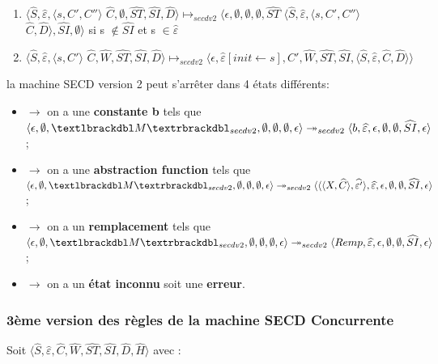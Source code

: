 \documentclass[10pt,a4paper]{article}
\begin{document}
\begin{enumerate}
					\item $\langle\widehat{S},\widehat{\varepsilon},\langle s, C',C''\rangle$ $\widehat{C},\emptyset,\widehat{ST},\widehat{SI},\widehat{D}\rangle \longmapsto_{secdv2} \langle\epsilon,\emptyset,\emptyset,\emptyset,\widehat{ST}$ $\langle\widehat{S},\widehat{\varepsilon},\langle s, C',C''\rangle$ $\widehat{C},\widehat{D}\rangle,\widehat{SI},\emptyset\rangle$ si s $\notin \widehat{SI}$ et s $\in \widehat{\varepsilon}$ 
					\item $\langle\widehat{S},\widehat{\varepsilon},\langle s, C'\rangle$ $\widehat{C},\widehat{W},\widehat{ST},\widehat{SI},\widehat{D}\rangle \longmapsto_{secdv2} \langle\epsilon,\widehat{\varepsilon}[init \leftarrow s],C',\widehat{W},\widehat{ST},\widehat{SI},\langle\widehat{S},\widehat{\varepsilon},\widehat{C},\widehat{D}\rangle\rangle$
				\end{enumerate}
				\bigbreak
				
				
				la machine SECD version 2 peut s'arrêter dans 4 états différents:
				\begin{itemize}
					\item[]$\longrightarrow$ on a une \textbf{constante b} tels que $\langle \epsilon,\emptyset,\textlbrackdbl M\textrbrackdbl_{secdv2},\emptyset,\emptyset,\emptyset,\epsilon\rangle \twoheadrightarrow_{secdv2} \langle b,\widehat{\varepsilon},\epsilon,\emptyset,\emptyset,\widehat{SI},\epsilon\rangle$;
					\item[]$\longrightarrow$ on a une \textbf{abstraction function} tels que $\langle \epsilon,\emptyset,\textlbrackdbl M\textrbrackdbl_{secdv2},\emptyset,\emptyset,\emptyset,\epsilon\rangle \twoheadrightarrow_{secdv2} \langle\langle\langle X,\widehat{C}\rangle,\widehat{\varepsilon'}\rangle,\widehat{\varepsilon},\epsilon,\emptyset,\emptyset,\widehat{SI},\epsilon\rangle$;
					\item[]$\longrightarrow$ on a un \textbf{remplacement} tels que $\langle \epsilon,\emptyset,\textlbrackdbl M\textrbrackdbl_{secdv2},\emptyset,\emptyset,\emptyset,\epsilon\rangle \twoheadrightarrow_{secdv2} \langle Remp,\widehat{\varepsilon},\epsilon,\emptyset,\emptyset,\widehat{SI},\epsilon\rangle$;
					\item[]$\longrightarrow$ on a un \textbf{état inconnu} soit une \textbf{erreur}.
				\end{itemize}
				\newpage
				
				\subsubsection{3ème version des règles de la machine SECD Concurrente}\label{SECDConc3}
					Soit $\langle\widehat{S},\widehat{\varepsilon},\widehat{C},\widehat{W},\widehat{ST},\widehat{SI},\widehat{D},\widehat{H}\rangle$ avec :
				
\end{document}
